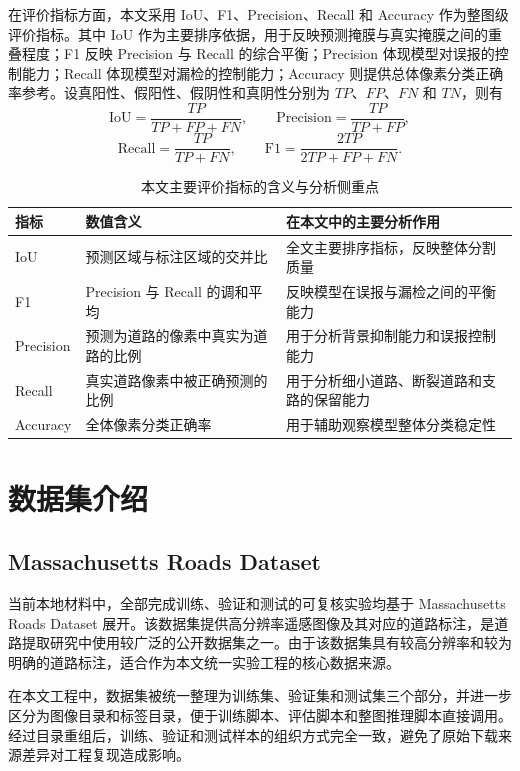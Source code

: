 在评价指标方面，本文采用 IoU、F1、Precision、Recall 和 Accuracy 作为整图级评价指标。其中 IoU 作为主要排序依据，用于反映预测掩膜与真实掩膜之间的重叠程度；F1 反映 Precision 与 Recall 的综合平衡；Precision 体现模型对误报的控制能力；Recall 体现模型对漏检的控制能力；Accuracy 则提供总体像素分类正确率参考。设真阳性、假阳性、假阴性和真阴性分别为 $TP$、$FP$、$FN$ 和 $TN$，则有
\[
\mathrm{IoU}=\frac{TP}{TP+FP+FN},\qquad
\mathrm{Precision}=\frac{TP}{TP+FP},
\]
\[
\mathrm{Recall}=\frac{TP}{TP+FN},\qquad
\mathrm{F1}=\frac{2TP}{2TP+FP+FN}.
\]

\begin{table}[htbp]
\centering
\caption{本文主要评价指标的含义与分析侧重点}
\label{tab:v2-metric-meaning}
\begin{tabular}{p{2.2cm}p{4.0cm}p{6.0cm}}
\toprule
指标 & 数值含义 & 在本文中的主要分析作用 \\
\midrule
IoU & 预测区域与标注区域的交并比 & 全文主要排序指标，反映整体分割质量 \\
F1 & Precision 与 Recall 的调和平均 & 反映模型在误报与漏检之间的平衡能力 \\
Precision & 预测为道路的像素中真实为道路的比例 & 用于分析背景抑制能力和误报控制能力 \\
Recall & 真实道路像素中被正确预测的比例 & 用于分析细小道路、断裂道路和支路的保留能力 \\
Accuracy & 全体像素分类正确率 & 用于辅助观察模型整体分类稳定性 \\
\bottomrule
\end{tabular}
\end{table}

\section{数据集介绍}
\subsection{Massachusetts Roads Dataset}
当前本地材料中，全部完成训练、验证和测试的可复核实验均基于 Massachusetts Roads Dataset 展开。该数据集提供高分辨率遥感图像及其对应的道路标注，是道路提取研究中使用较广泛的公开数据集之一\cite{mnih2013}。由于该数据集具有较高分辨率和较为明确的道路标注，适合作为本文统一实验工程的核心数据来源。

在本文工程中，数据集被统一整理为训练集、验证集和测试集三个部分，并进一步区分为图像目录和标签目录，便于训练脚本、评估脚本和整图推理脚本直接调用。经过目录重组后，训练、验证和测试样本的组织方式完全一致，避免了原始下载来源差异对工程复现造成影响。

